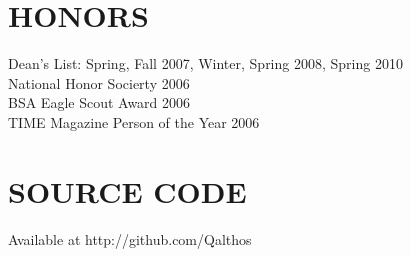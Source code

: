 \documentclass[line]{res}
\begin{document}
\begin{resume}
\section{HONORS} Dean's List: Spring, Fall 2007, Winter, Spring 2008, Spring 2010 \\
                 National Honor Socierty 2006 \\
                 BSA Eagle Scout Award 2006 \\
                 TIME Magazine Person of the Year 2006 \\

\section{SOURCE CODE} Available at http://github.com/Qalthos \\

\end{resume}
\end{document}
